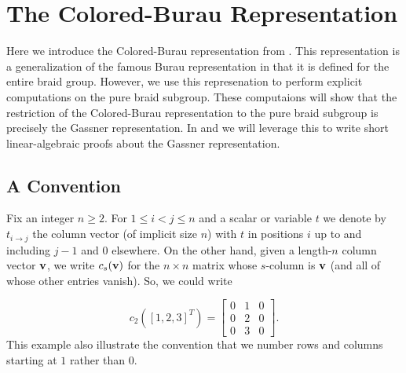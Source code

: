 \documentclass[11pt]{article}
\begin{document}
\section{The Colored-Burau Representation}\label{sec:cb}
Here we introduce the Colored-Burau representation from \cite{aagl}. This representation is a generalization of the famous Burau representation in that it is defined for the entire braid group. However, we use this represenation to perform explicit computations on the pure braid subgroup. These computaions will show that the restriction of the Colored-Burau representation to the pure braid subgroup is precisely the Gassner representation. In  and  we will leverage this to write short linear-algebraic proofs about the Gassner representation.

\subsection{A Convention}\label{subsec:convention}
Fix an integer $n\geq 2$. For $1\le i<j\le n$ and a scalar or variable $t$ we denote by 
$t_{i\to j}$ the column vector (of implicit size $n$) with $t$ in positions $i$ up to 
and including $j-1$ and $0$ elsewhere. On the other hand, given a length-$n$ column 
vector ${\bf v}$, we write $c_s({\bf v})$ for the $n\times n$ matrix whose $s$-column is 
${\bf v}$ (and all of whose other entries vanish). So, we could write

\begin{equation*}
c_2([1,2,3]^T)=
\begin{bmatrix}
0&1&0\\
0&2&0\\
0&3&0
\end{bmatrix}.
\end{equation*}
This example also illustrate the convention that we number rows and columns starting 
at $1$ rather than $0$.
\end{document}
